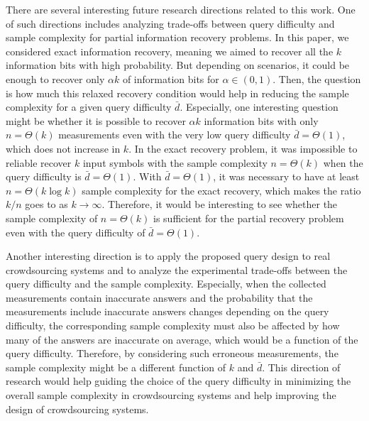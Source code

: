\documentclass[11pt,onecolumn]{IEEEtran}
\newcommand{\bard}{\bar{d}}
\begin{document}
\iffalse
There are several interesting future research directions related to this work. 
One of such directions includes analyzing trade-offs between query difficulty and sample complexity for partial information recovery problems.
In this paper, we considered exact information recovery, meaning we aimed to recover all the $k$ information bits with high probability. 
But depending on scenarios, it could be enough to recover only $\alpha k$ of information bits for $\alpha\in(0,1)$.
Then, the question is how much this relaxed recovery condition would help in reducing the sample complexity for a given query difficulty $\bard$.
Especially, one interesting question might be whether it is possible to recover $\alpha k$ information bits with only $n=\Theta(k)$ measurements even with the very low query difficulty $\bard=\Theta(1)$, which does not increase in $k$. In the exact recovery problem, it was impossible to reliable recover $k$ input symbols with the sample complexity $n=\Theta(k)$ when the query difficulty is $\bard=\Theta(1)$. With $\bard=\Theta(1)$, it was necessary to have at least $n=\Theta(k\log k)$ sample complexity for the exact recovery, which makes the ratio $k/n$ goes to as $k\to\infty$. Therefore, it would be interesting to see whether the sample complexity of $n=\Theta(k)$ is sufficient for the partial recovery problem even with the query difficulty of $\bard=\Theta(1)$.

Another interesting direction is to apply the proposed query design to real crowdsourcing systems and to analyze the experimental trade-offs between the query difficulty and the sample complexity.
Especially, when the collected measurements contain inaccurate answers and the probability that the measurements include inaccurate answers changes depending on the query difficulty, the corresponding sample complexity must also be affected by how many of the answers are inaccurate on average, which would be a function of the query difficulty. Therefore, by considering such erroneous measurements, the sample complexity might be a different function of $k$ and $\bard$. This direction of research would help guiding the choice of the query difficulty in minimizing the overall sample complexity in crowdsourcing systems and help improving the design of crowdsourcing systems. 



\appendices
\end{document}
